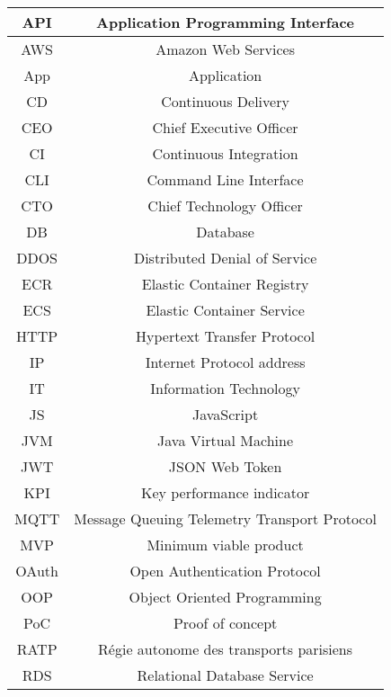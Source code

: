 \begin{table}[!htpb]
    \centering
    \begin{tabular}{| c | c |}
        \hline
        API & Application Programming Interface\\
        \hline
        AWS & Amazon Web Services\\
        \hline
        App & Application\\
        \hline
        CD  & Continuous Delivery\\
        \hline
        CEO & Chief Executive Officer\\
        \hline
        CI  & Continuous Integration\\
        \hline
        CLI & Command Line Interface\\
        \hline
        CTO & Chief Technology Officer\\
        \hline
        DB   & Database\\
        \hline
        DDOS & Distributed Denial of Service\\
        \hline
        ECR  & Elastic Container Registry\\
        \hline
        ECS  & Elastic Container Service\\
        \hline
        HTTP & Hypertext Transfer Protocol\\
        \hline
        IP   & Internet Protocol address\\
        \hline
        IT   & Information Technology\\
        \hline
        JS   & JavaScript\\
        \hline
        JVM  & Java Virtual Machine\\
        \hline
        JWT  & JSON Web Token\\
        \hline
        KPI  & Key performance indicator\\
        \hline
        MQTT & Message Queuing Telemetry Transport Protocol\\
        \hline
        MVP  & Minimum viable product\\
        \hline
        OAuth & Open Authentication Protocol\\
        \hline
        OOP  & Object Oriented Programming\\
        \hline
        PoC  & Proof of concept\\
        \hline
        RATP & Régie autonome des transports parisiens\\
        \hline
        RDS  & Relational Database Service\\

\end{tabular}
\end{table}
